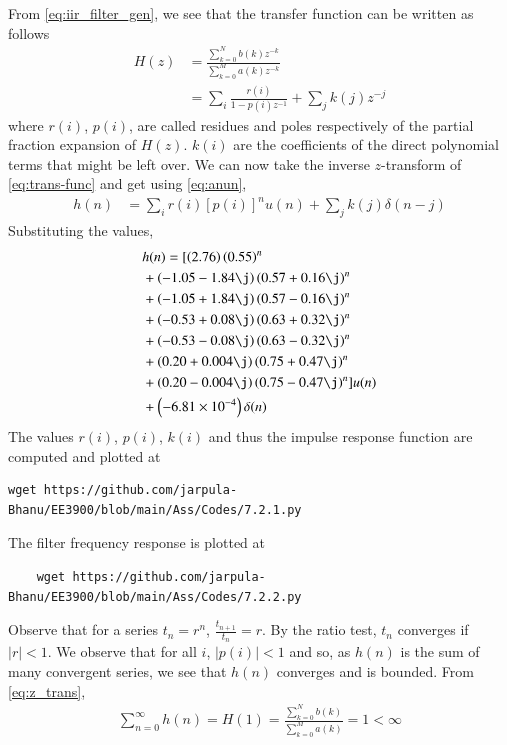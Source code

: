 \documentclass[journal,12pt,twocolumn]{IEEEtran}
\renewcommand\thesection{\arabic{section}}
\begin{document}
\begin{enumerate}[label=\thesection.\arabic*]
From \eqref{eq:iir_filter_gen}, we see that the transfer function can be written as follows
\begin{align}
	H(z) &= \frac{\sum_{k = 0}^{N}b(k)z^{-k}}{\sum_{k = 0}^{M}a(k)z^{-k}} \\
		 &= \sum_{i}\frac{r(i)}{1 - p(i)z^{-1}} + \sum_{j}k(j)z^{-j}
	\label{eq:trans-func}
\end{align}
where $r(i)$, $p(i)$, are called residues and poles respectively of the partial 
fraction expansion of $H(z)$. $k(i)$ are the coefficients of the direct polynomial 
terms that might be left over. We can now take the inverse $z$-transform of
\eqref{eq:trans-func} and get using \eqref{eq:anun},
\begin{align}
	h(n) &= \sum_{i}r(i)[p(i)]^nu(n) + \sum_{j}k(j)\delta(n - j)
	\label{eq:h-n-expr}
\end{align}
Substituting the values,
\begin{align}
	&h(n) = [\brak{2.76}\brak{0.55}^n \nonumber \\ 
	&+ \brak{-1.05-1.84\j}\brak{0.57+0.16\j}^n \nonumber \\
	&+ \brak{-1.05+1.84\j}\brak{0.57-0.16\j}^n \nonumber \\
	&+ \brak{-0.53+0.08\j}\brak{0.63+0.32\j}^n \nonumber \\
	&+ \brak{-0.53-0.08\j}\brak{0.63-0.32\j}^n \nonumber \\
	&+ \brak{0.20+0.004\j}\brak{0.75+0.47\j}^n \nonumber \\
	&+ \brak{0.20-0.004\j}\brak{0.75-0.47\j}^n]u(n) \nonumber \\
	&+ \brak{-6.81 \times 10^{-4}}\delta(n)
\end{align}
The values $r(i)$, $p(i)$, $k(i)$ and thus the impulse response function are computed and plotted at
\begin{lstlisting}
wget https://github.com/jarpula-Bhanu/EE3900/blob/main/Ass/Codes/7.2.1.py
\end{lstlisting}
The filter frequency response is plotted at
\begin{lstlisting}
	wget https://github.com/jarpula-Bhanu/EE3900/blob/main/Ass/Codes/7.2.2.py
\end{lstlisting}
Observe that for a series $t_n = r^n$, $\frac{t_{n + 1}}{t_n} = r$.
By the ratio test, $t_n$ converges if $|r| < 1$. We observe that for all $i$, 
$|p(i)| < 1$ and so, as $h(n)$ is the sum of many convergent series,
we see that $h(n)$ converges and is bounded. From \eqref{eq:z_trans},
\begin{align}
	\sum_{n = 0}^{\infty}h(n) = H(1) = \frac{\sum_{k = 0}^{N}b(k)}{\sum_{k = 0}^{M}a(k)} = 1 < \infty

\end{align}
\end{enumerate}
\end{document}
